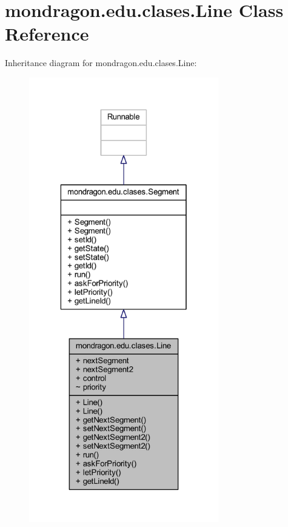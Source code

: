 \hypertarget{classmondragon_1_1edu_1_1clases_1_1_line}{}\section{mondragon.\+edu.\+clases.\+Line Class Reference}
\label{classmondragon_1_1edu_1_1clases_1_1_line}


Inheritance diagram for mondragon.\+edu.\+clases.\+Line\+:\nopagebreak
\begin{figure}[H]
\begin{center}
\leavevmode
\includegraphics[height=550pt]{classmondragon_1_1edu_1_1clases_1_1_line__inherit__graph}
\end{center}
\end{figure}


